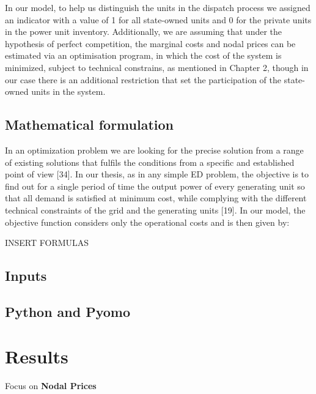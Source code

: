 \documentclass[eng]{ajceam-class}
\begin{document}
In our model, to help us distinguish the units in the dispatch process we assigned an indicator with a value of 1 for all state-owned units and 0 for the private units in the power unit inventory. Additionally, we are assuming that under the hypothesis of perfect competition, the marginal costs and nodal prices can be estimated via an optimisation program, in which the cost of the system is minimized, subject to technical constrains, as mentioned in Chapter 2, though in our case there is an additional restriction that set the participation of the state-owned units in the system.

\subsection{Mathematical formulation}

In an optimization problem we are looking for the precise solution from a range of existing solutions that fulfils the conditions from a specific and established point of view [34]. In our thesis, as in any simple ED problem, the objective is to find out for a single period of time the output power of every generating unit so that all demand is satisfied at minimum cost, while complying with the different technical constraints of the grid and the generating units [19]. In our model, the objective function considers only the operational costs and is then given by:

INSERT FORMULAS

\subsection{Inputs}

\subsection{Python and Pyomo}


\section{Results}
Focus on \textbf{Nodal Prices}


\end{document}
